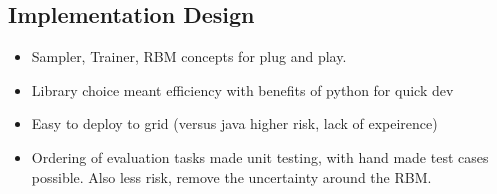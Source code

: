 \subsection{Implementation Design}

\begin{itemize}
  \item Sampler, Trainer, RBM concepts for plug and play.
  \item Library choice meant efficiency with benefits of python for quick dev
  \item Easy to deploy to grid (versus java higher risk, lack of expeirence)
  \item Ordering of evaluation tasks made unit testing, with hand made test cases possible. Also less risk, remove the uncertainty around the RBM.
\end{itemize}

